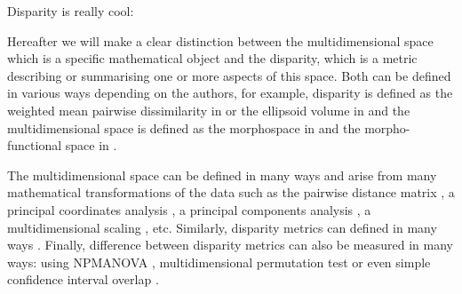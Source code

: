 \documentclass[12pt,letterpaper]{article}
\begin{document}









Disparity is really cool:


Hereafter we will make a clear distinction between the multidimensional space which is a specific mathematical object and the disparity, which is a metric describing or summarising one or more aspects of this space.
Both can be defined in various ways depending on the authors, for example, disparity is defined as the weighted mean pairwise dissimilarity in \cite{Close2015} or the ellipsoid volume in \cite{DonohueDim} and the multidimensional space is defined as the morphospace in \cite{raup1966geometric} and the morpho-functional space in \cite{diaz2016global}.

The multidimensional space can be defined in many ways and arise from many mathematical transformations of the data such as the pairwise distance matrix \citep{Close2015}, a principal coordinates analysis \citep[PCO;][]{Brusatte12092008}, a principal components analysis \citep[PCA;][]{zelditch2012geometric}, a multidimensional scaling \citep[MDS;][]{DonohueDim}, etc.
Similarly, disparity metrics \citep[or indices;][]{Hopkins2017} can defined in many ways \citep[e.g.][or combinations thereof]{Wills2001,Ciampaglio2001,foth2012different,DonohueDim,Hughes20082013,finlay2015morphological,Close2015,diaz2016global}.
Finally, difference between disparity metrics can also be measured in many ways: using NPMANOVA \citep[e.g.][]{Brusatte12092008}, multidimensional permutation test \citep[e.g.][]{diaz2016global} or even simple confidence interval overlap \citep[e.g.][]{halliday2016eutherian}.
\end{document}
